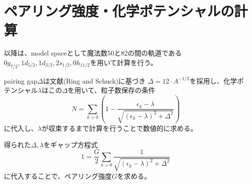 \documentclass[a4paper,11pt]{jsreport}
\begin{document}
  \section{ペアリング強度・化学ポテンシャルの計算}
  以降は、model spaceとして魔法数50と82の間の軌道である\(0g_{7/2},1d_{5/2},1d_{3/2},2s_{1/2},0h_{11/2}\)を用いて計算を行う。

  pairing gap\(\Delta\)は文献(Ring and Schuck\cite{thenuclearmanybody})に基づき
  \(\Delta=12\cdot A^{-1/2}\)を採用し、化学ポテンシャル\(\lambda\)はこの\(\Delta\)を用いて、粒子数保存の条件
  \begin{equation}
    N=\sum_{k>0}\left(1-\frac{\epsilon_k - \lambda}{\sqrt{(\epsilon_k-\lambda)^2+\Delta^2}}\right) \label{number2}
  \end{equation}
  に代入し、$\lambda$が収束するまで計算を行うことで数値的に求める。

  得られた\(\Delta,\lambda\)をギャップ方程式
  \begin{equation}
    1 = \dfrac{G}{2}\sum_{k>0}\dfrac{1}{\sqrt{(\epsilon_k-\lambda)^2+\Delta^2}} \label{Delta3}
  \end{equation}
  に代入することで、ペアリング強度\(G\)を求める。
\end{document}

